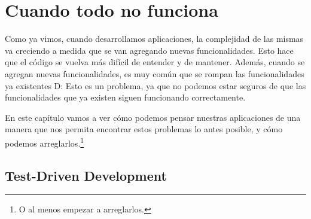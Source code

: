 \chapter{Cuando todo no funciona}
  \label{chap:cuando-todo-no-funciona}

  Como ya vimos, cuando desarrollamos aplicaciones, la complejidad de las mismas va creciendo a 
  medida que se van agregando nuevas funcionalidades. 
  Esto hace que el código se vuelva más difícil de entender y de mantener. 
  Además, cuando se agregan nuevas funcionalidades, es muy común que se rompan las funcionalidades 
  ya existentes D: 
  Esto es un problema, ya que no podemos estar seguros de que las funcionalidades que ya existen 
  siguen funcionando correctamente.

  En este capítulo vamos a ver cómo podemos pensar nuestras aplicaciones de una manera que nos
  permita encontrar estos problemas lo antes posible, y cómo podemos arreglarlos.\footnote{
    O al menos empezar a arreglarlos.
  }

  \section{Test-Driven Development}
    \label{sec:tdd}

    